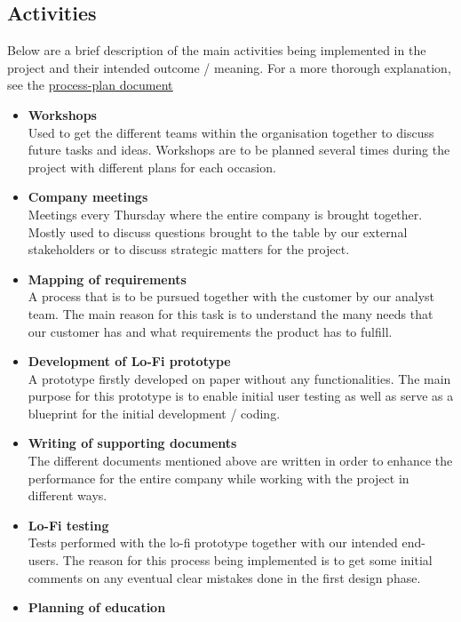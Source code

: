 \subsection{Activities}
Below are a brief description of the main activities being implemented in the project and their intended outcome / meaning. For a more thorough explanation, see the \href{https://gitlab.liu.se/tddc88-company-3-2020/deploy/-/tree/Document_branch/Process_plan}{\underline{process-plan document}}
\begin{itemize}
    \item{\textbf{Workshops}} \\
    Used to get the different teams within the organisation together to discuss future tasks and ideas. Workshops are to be planned several times during the project with different plans for each occasion. 
    \item{\textbf{Company meetings}} \\
    Meetings every Thursday where the entire company is brought together. Mostly used to discuss questions brought to the table by our external stakeholders or to discuss strategic matters for the project. 
    \item{\textbf{Mapping of requirements}} \\
    A process that is to be pursued together with the customer by our analyst team. The main reason for this task is to understand the many needs that our customer has and what requirements the product has to fulfill. 
    \item{\textbf{Development of Lo-Fi prototype}} \\
    A prototype firstly developed on paper without any functionalities. The main purpose for this prototype is to enable initial user testing as well as serve as a blueprint for the initial development / coding. 
    \item{\textbf{Writing of supporting documents}} \\
    The different documents mentioned above are written in order to enhance the performance for the entire company while working with the project in different ways. 
    \item{\textbf{Lo-Fi testing}} \\
    Tests performed with the lo-fi prototype together with our intended end-users. The reason for this process being implemented is to get some initial comments on any eventual clear mistakes done in the first design phase. 
    \item{\textbf{Planning of education}} \\

\end{itemize}
